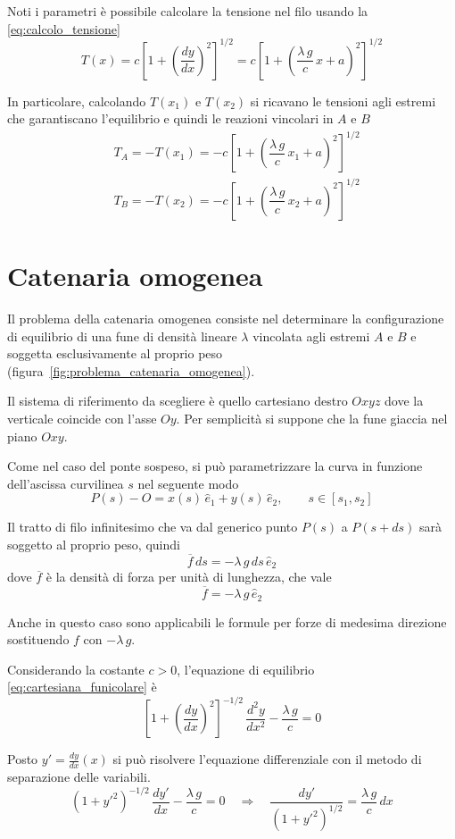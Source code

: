 Noti i parametri è possibile calcolare la tensione nel filo usando la \eqref{eq:calcolo_tensione}
\[
 T(x) = c\left[1+\left(\dfrac{dy}{dx}\right)^2\right]^{1/2} = c\left[1+\left(\dfrac{\lambda\,g}{c}\,x + a\right)^2\right]^{1/2}
\]

In particolare, calcolando $T(x_1)$ e $T(x_2)$ si ricavano le tensioni agli estremi che garantiscano l'equilibrio e quindi le reazioni vincolari in $A$ e $B$
\begin{align*}
 &T_A = -T(x_1) = -c\left[1+\left(\dfrac{\lambda\,g}{c}\,x_1 + a\right)^2\right]^{1/2}\\
 &T_B = -T(x_2) = -c\left[1+\left(\dfrac{\lambda\,g}{c}\,x_2 + a\right)^2\right]^{1/2}
 \end{align*}
 
 \section{Catenaria omogenea}
 
 Il problema della catenaria omogenea consiste nel determinare la configurazione di equilibrio di una fune di densità lineare $\lambda$ vincolata agli estremi $A$ e $B$ e soggetta esclusivamente al proprio peso (figura~\ref{fig:problema_catenaria_omogenea}). 
 
 Il sistema di riferimento da scegliere è quello cartesiano destro $Oxyz$ dove la verticale coincide con l'asse $Oy$. Per semplicità si suppone che la fune giaccia nel piano $Oxy$.
 
 Come nel caso del ponte sospeso, si può parametrizzare la curva in funzione dell'ascissa curvilinea $s$ nel seguente modo
 \[
  P(s) - O = x(s)\,\hat{e}_1 + y(s)\,\hat{e}_2,\qquad s\in[s_1, s_2]
 \]
 
Il tratto di filo infinitesimo che va dal generico punto $P(s)$ a $P(s+ds)$ sarà soggetto al proprio peso, quindi
\[
 \overline{f}\,ds = -\lambda\,g\,ds\,\hat{e}_2
\]
dove $\overline{f}$ è la densità di forza per unità di lunghezza, che vale
\[
 \overline{f} = -\lambda\,g\,\hat{e}_2
\]

Anche in questo caso sono applicabili le formule per forze di medesima direzione sostituendo $f$ con $-\lambda\,g$.

Considerando la costante $c>0$, l'equazione di equilibrio \eqref{eq:cartesiana_funicolare} è
\[
 \left[1+\left(\dfrac{dy}{dx}\right)^2\right]^{-1/2}\,\dfrac{d^2y}{dx^2} - \dfrac{\lambda\,g}{c} = 0
\]

Posto $y' = \frac{dy}{dx}(x)$ si può risolvere l'equazione differenziale con il metodo di separazione delle variabili.
\[
 \left(1+y'^2\right)^{-1/2}\,\dfrac{dy'}{dx} - \dfrac{\lambda\,g}{c} = 0 \quad \Longrightarrow\quad \dfrac{dy'}{\left(1+y'^2\right)^{1/2}} = \dfrac{\lambda\,g}{c}\,dx
\]

